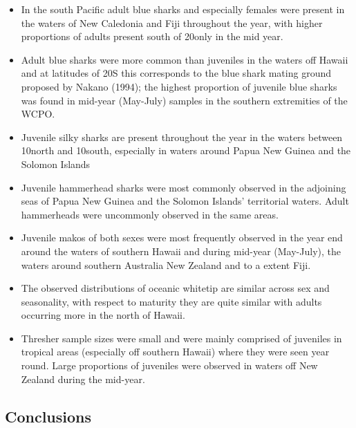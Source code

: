 \documentclass[12pt]{SCreport}
\begin{document}
 
\begin{itemize}
  \item In the south Pacific adult blue sharks and especially females were present in the waters of New Caledonia and Fiji throughout the year, with higher proportions of adults present south of 20\degree only in the mid year. 
  \item Adult blue sharks were more common than juveniles in the waters off Hawaii and at latitudes of 20\degree S this corresponds to the blue shark mating ground proposed by Nakano (1994); the highest proportion of juvenile blue sharks was found in mid-year (May-July) samples in the southern extremities of the WCPO.
  \item  Juvenile silky sharks are present throughout the year in the waters between 10\degree north and 10\degree south, especially in waters around Papua New Guinea and the Solomon Islands
\item Juvenile hammerhead sharks were most commonly observed in the adjoining seas of Papua New Guinea and the Solomon Islands' territorial waters.    Adult hammerheads were uncommonly observed in the same areas.  

\item Juvenile makos of both sexes were most frequently observed in the year end around the waters of southern Hawaii and during  mid-year (May-July), the waters around southern Australia New Zealand and to a extent Fiji.  

\item The observed distributions of oceanic whitetip are similar across sex and seasonality, with respect to maturity they are quite similar with adults occurring more in the north of Hawaii.

\item Thresher sample sizes were small and were mainly comprised of juveniles in tropical areas (especially off southern Hawaii) where they were seen year round. Large proportions of juveniles were observed in waters off New Zealand during the mid-year.
\end{itemize}

            
\subsection{Conclusions}
\end{document}
